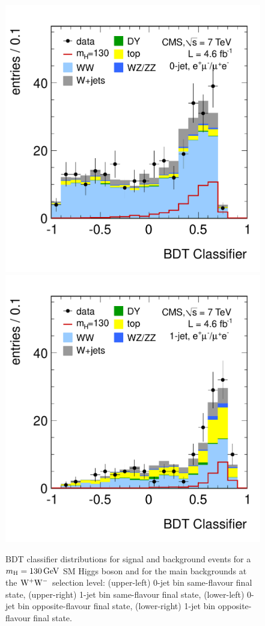 \documentclass[12pt,twoside,a4paper,cmspaper,final,collab]{cms-tdr}
\begin{document}
\begin{figure}[htbp]
\begin{center}
   \includegraphics[width=\cmsFigWidth]{histo_mva_130_0j_of}
   \includegraphics[width=\cmsFigWidth]{histo_mva_130_1j_of}
       \caption{BDT classifier distributions for signal and background
events for a $m_{\mathrm{H}}=130\,\text{Ge\hspace{-.08em}V}$ SM Higgs boson and for the main backgrounds at the $\mathrm{W^+}{}\mathrm{W^-}$ selection
level: (upper-left) 0-jet bin same-flavour final state, (upper-right) 1-jet bin same-flavour final state, (lower-left) 0-jet bin opposite-flavour
final state, (lower-right) 1-jet bin opposite-flavour final state.} \label{fig:histo_mva_130}
\end{center}
\end{figure}
\end{document}
